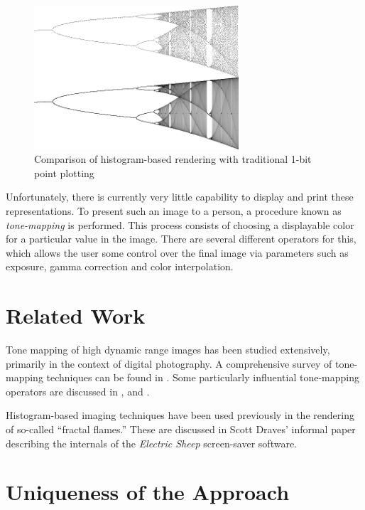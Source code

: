 \documentclass[letterpaper, 11pt]{article}
\begin{document}
\begin{figure}[htb]
\centering
\includegraphics[width=3in]{logistic-combined.png}
\caption{Comparison of histogram-based rendering with traditional 1-bit point plotting}
\end{figure}

Unfortunately, there is currently very little capability to display and print these
representations.  To present such an image to a person, a procedure known as
\emph{tone-mapping} is performed.  This process consists of choosing a displayable color for
a particular value in the image.  There are several different operators for this, which
allows the user some control over the final image via parameters such as exposure, gamma
correction and color interpolation.



\section{Related Work}
Tone mapping of high dynamic range images has been studied extensively, primarily in the
context of digital photography.  A comprehensive survey of tone-mapping techniques can be
found in \cite{kd}.  Some particularly influential tone-mapping operators are discussed
in \cite{jt}, \cite{jtjhbg} and \cite{gw}.

Histogram-based imaging techniques have been used previously in the rendering of so-called
``fractal flames.''  These are discussed in Scott Draves' informal paper describing the
internals of the \emph{Electric Sheep} screen-saver software\cite{sd}.

\section{Uniqueness of the Approach}
\end{document}
